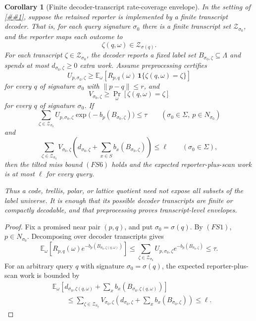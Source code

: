 \documentclass[10pt]{article}
\newcommand{\cref}[1]{\ref{##1}}
\newtheorem{corollary}[theorem]{Corollary}
\theoremstyle{definition}
\newcommand{\E}{\mathbb{E}}
\begin{document}
\begin{corollary}[Finite decoder-transcript rate-coverage envelope]
   \label{cor:finite-transcript-rate-coverage}
   In the setting of \cref{lem:finite-signature-rate-coverage}, suppose the
   retained reporter is implemented by a finite transcript decoder.  That is,
   for each query signature \(\sigma_0\) there is a finite transcript set
   \(\mathcal Z_{\sigma_0}\), and the reporter maps each outcome to
   \[
      \zeta(q,\omega)\in\mathcal Z_{\sigma(q)} .
   \]
   For each transcript \(\zeta\in\mathcal Z_{\sigma_0}\), the decoder reports
   a fixed label set \(B_{\sigma_0,\zeta}\subseteq\Lambda\) and spends at most
   \(d_{\sigma_0,\zeta}\ge0\) extra work.  Assume preprocessing certifies
   \[
      U_{p,\sigma_0,\zeta}
      \ge
      \E_\omega\!\left[
         R_{p,q}(\omega)\,
         \mathbf 1\{\zeta(q,\omega)=\zeta\}
      \right]
      \tag{DT1}
   \]
   for every \(q\) of signature \(\sigma_0\) with \(\|p-q\|\le r\), and
   \[
      V_{\sigma_0,\zeta}
      \ge
      \Pr_\omega[\zeta(q,\omega)=\zeta]
      \tag{DT2}
   \]
   for every \(q\) of signature \(\sigma_0\).  If
   \[
      \sum_{\zeta\in\mathcal Z_{\sigma_0}}
      U_{p,\sigma_0,\zeta}
      \exp\!\bigl(-b_p(B_{\sigma_0,\zeta})\bigr)
      \le \tau
      \qquad(\sigma_0\in\Sigma,\ p\in N_{\sigma_0})
      \tag{DT3}
   \]
   and
   \[
      \sum_{\zeta\in\mathcal Z_{\sigma_0}}
      V_{\sigma_0,\zeta}
      \left(
         d_{\sigma_0,\zeta}
         +\sum_{x\in S}b_x(B_{\sigma_0,\zeta})
      \right)
      \le \ell
      \qquad(\sigma_0\in\Sigma),
      \tag{DT4}
   \]
   then the tilted miss bound \((FS6)\) holds and the expected reporter-plus-scan
   work is at most \(\ell\) for every query.

   Thus a code, trellis, polar, or lattice quotient need not expose all
   subsets of the label universe.  It is enough that its possible decoder
   transcripts are finite or compactly decodable, and that preprocessing proves
   transcript-level envelopes.
\end{corollary}

\begin{proof}
   Fix a promised near pair \((p,q)\), and put \(\sigma_0=\sigma(q)\).  By
   \((FS1)\), \(p\in N_{\sigma_0}\).  Decomposing over decoder transcripts
   gives
   \[
      \E_\omega\!\left[
         R_{p,q}(\omega)
         e^{-b_p(B_{\sigma_0,\zeta(q,\omega)})}
      \right]
      \le
      \sum_{\zeta\in\mathcal Z_{\sigma_0}}
      U_{p,\sigma_0,\zeta}
      e^{-b_p(B_{\sigma_0,\zeta})}
      \le\tau .
   \]
   For an arbitrary query \(q\) with signature \(\sigma_0=\sigma(q)\), the
   expected reporter-plus-scan work is bounded by
   \[
   \begin{aligned}
      &\E_\omega\!\left[
         d_{\sigma_0,\zeta(q,\omega)}
         +\sum_xb_x(B_{\sigma_0,\zeta(q,\omega)})
      \right]  \\
      &\qquad\le
      \sum_{\zeta\in\mathcal Z_{\sigma_0}}
      V_{\sigma_0,\zeta}
      \left(
         d_{\sigma_0,\zeta}
         +\sum_xb_x(B_{\sigma_0,\zeta})
      \right)
      \le\ell .
   \end{aligned}
   \]
\end{proof}
\end{document}
